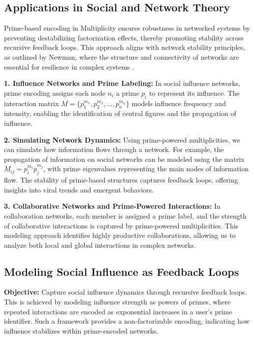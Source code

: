 \documentclass{article}
\theoremstyle{plain}
\begin{document}
\subsection{Applications in Social and Network Theory}
Prime-based encoding in Multiplicity ensures robustness in networked systems by preventing destabilizing factorization effects, thereby promoting stability across recursive feedback loops. This approach aligns with network stability principles, as outlined by Newman, where the structure and connectivity of networks are essential for resilience in complex systems \cite{newman2018}.

\textbf{1. Influence Networks and Prime Labeling:} In social influence networks, prime encoding assigns each node \( n_i \) a prime \( p_i \) to represent its influence. The interaction matrix \( M = \{ p_1^{m_1}, p_2^{m_2}, \ldots, p_n^{m_n} \} \) models influence frequency and intensity, enabling the identification of central figures and the propagation of influence.

\textbf{2. Simulating Network Dynamics:} Using prime-powered multiplicities, we can simulate how information flows through a network. For example, the propagation of information on social networks can be modeled using the matrix \( M_{ij} = p_i^{m_i} p_j^{m_j} \), with prime eigenvalues representing the main nodes of information flow. The stability of prime-based structures captures feedback loops, offering insights into viral trends and emergent behaviors.

\textbf{3. Collaborative Networks and Prime-Powered Interactions:} In collaboration networks, each member is assigned a prime label, and the strength of collaborative interactions is captured by prime-powered multiplicities. This modeling approach identifies highly productive collaborations, allowing us to analyze both local and global interactions in complex networks.

\subsection{Modeling Social Influence as Feedback Loops}

\textbf{Objective:} Capture social influence dynamics through recursive feedback loops. This is achieved by modeling influence strength as powers of primes, where repeated interactions are encoded as exponential increases in a user’s prime identifier. Such a framework provides a non-factorizable encoding, indicating how influence stabilizes within prime-encoded networks.
\end{document}
